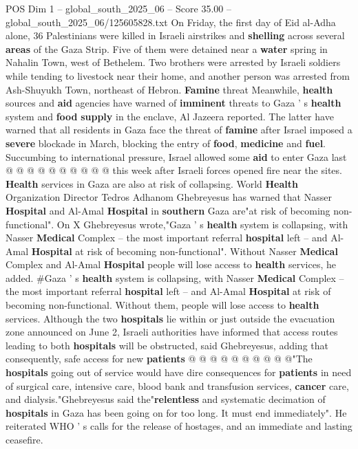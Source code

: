\begin{textsample}{POS Dim 1 – global\_south\_2025\_06 – Score 35.00 – global\_south\_2025\_06/125605828.txt}
On Friday, the first day of Eid al-Adha alone, 36 Palestinians were killed in Israeli airstrikes and \textbf{shelling} across several \textbf{areas} of the Gaza Strip.
Five of them were detained near a \textbf{water} spring in Nahalin Town, west of Bethelem.
Two brothers were arrested by Israeli soldiers while tending to livestock near their home, and another person was arrested from Ash-Shuyukh Town, northeast of Hebron. \textbf{Famine} threat Meanwhile, \textbf{health} sources and \textbf{aid} agencies have warned of \textbf{imminent} threats to Gaza ' s \textbf{health} system and \textbf{food} \textbf{supply} in the enclave, Al Jazeera reported.
The latter have warned that all residents in Gaza face the threat of \textbf{famine} after Israel imposed a \textbf{severe} blockade in March, blocking the entry of \textbf{food}, \textbf{medicine} and \textbf{fuel}.
Succumbing to international pressure, Israel allowed some \textbf{aid} to enter Gaza last @ @ @ @ @ @ @ @ @ @ this week after Israeli forces opened fire near the sites. \textbf{Health} services in Gaza are also at risk of collapsing.
World \textbf{Health} Organization Director Tedros Adhanom Ghebreyesus has warned that Nasser \textbf{Hospital} and Al-Amal \textbf{Hospital} in \textbf{southern} Gaza are"at risk of becoming non-functional".
On X Ghebreyesus wrote,"Gaza ' s \textbf{health} system is collapsing, with Nasser \textbf{Medical} Complex -- the most important referral \textbf{hospital} left -- and Al-Amal \textbf{Hospital} at risk of becoming non-functional".
Without Nasser \textbf{Medical} Complex and Al-Amal \textbf{Hospital} people will lose access to \textbf{health} services, he added. \#Gaza ' s \textbf{health} system is collapsing, with Nasser \textbf{Medical} Complex -- the most important referral \textbf{hospital} left -- and Al-Amal \textbf{Hospital} at risk of becoming non-functional.
Without them, people will lose access to \textbf{health} services.
Although the two \textbf{hospitals} lie within or just outside the evacuation zone announced on June 2, Israeli authorities have informed that access routes leading to both \textbf{hospitals} will be obstructed, said Ghebreyesus, adding that consequently, safe access for new \textbf{patients} @ @ @ @ @ @ @ @ @ @"The \textbf{hospitals} going out of service would have dire consequences for \textbf{patients} in need of surgical care, intensive care, blood bank and transfusion services, \textbf{cancer} care, and dialysis."Ghebreyesus said the"\textbf{relentless} and systematic decimation of \textbf{hospitals} in Gaza has been going on for too long.
It must end immediately".
He reiterated WHO ' s calls for the release of hostages, and an immediate and lasting ceasefire.

\end{textsample}
